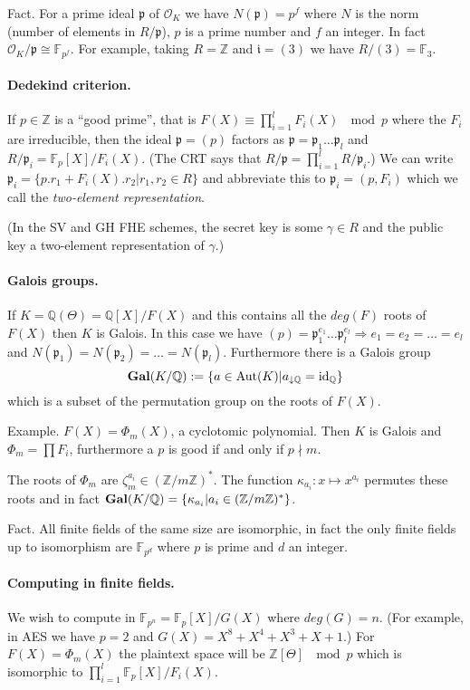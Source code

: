 \documentclass[11pt]{article}
\newcommand{\F}{\mathbb{F}}
\newcommand{\Z}{\mathbb{Z}}
\newcommand{\Q}{\mathbb{Q}}
\renewcommand{\O}{\mathcal{O}}
\renewcommand{\i}{\mathfrak{i}}
\newcommand{\p}{\mathfrak{p}}
\newcommand{\Gal}{\textup{\textbf{Gal}}}
\begin{document}
Fact. For a prime ideal $\p$ of $\O_K$ we have $N(\p) = p^f$ where $N$ is the norm (number of elements in $R/\p$), $p$ is a prime number and $f$ an integer. 
In fact $\O_K/\p \cong \F_{p^f}$.
For example, taking $R = \Z$ and $\i = (3)$ we have $R/(3) = \F_3$.

\paragraph{Dedekind criterion.}
If $p \in \Z$ is a ``good prime'', that is 
$F(X) \equiv \prod_{i=1}^l F_i(X)\ \mod p$ where the $F_i$ are irreducible, then the ideal $\p = (p)$ factors as $\p = \p_1 \ldots \p_l$ and $R/\p_i = \F_p[X]/F_i(X)$.
(The CRT says that $R/\p = \prod_{i=1}^l R/\p_i$.)
We can write $\p_i = \{ p.r_1 + F_i(X).r_2 | r_1, r_2 \in R \}$ and abbreviate this to $\p_i = (p, F_i)$ which we call the \emph{two-element representation}.

(In the SV and GH FHE schemes, the secret key is some $\gamma \in R$ and the public key a two-element representation of $\gamma$.)

\paragraph{Galois groups.}
If $K = \Q(\Theta) = \Q[X]/F(X)$ and this contains all the $deg(F)$ roots of $F(X)$ then $K$ is Galois. 
In this case we have
 $(p) = \p_1^{e_1} \ldots \p_l^{e_l} \Rightarrow e_1 = e_2 = \ldots = e_l$ and $N(\p_1) = N(\p_2) = \ldots = N(\p_l)$.
Furthermore there is a Galois group 
$$\Gal(K/\Q) := \{ a \in \textup{Aut}(K) | a_{\downarrow \Q} = \textup{id}_\Q \}$$ 
which is a subset of the permutation group on the roots of $F(X)$.

Example. $F(X) = \Phi_m(X)$, a cyclotomic polynomial. 
Then $K$ is Galois and $\Phi_m = \prod F_i$, furthermore a $p$ is good if and only if $p \nmid m$.

The roots of $\Phi_m$ are $\zeta_m^{a_i} \in (\Z/m\Z)^*$.
The function $\kappa_{a_i}: x \mapsto x^{a_i}$ permutes these roots and in fact $\Gal(K/\Q) = \{ \kappa_{a_i} | a_i \in (\Z/m\Z)^* \}$.

Fact. All finite fields of the same size are isomorphic, in fact the only finite fields up to isomorphism are $\F_{p^d}$ where $p$ is prime and $d$ an integer.

\paragraph{Computing in finite fields.}
We wish to compute in $\F_{p^n} = \F_p[X]/G(X)$ where $deg(G) = n$.
(For example, in AES we have $p = 2$ and $G(X) = X^8 + X^4 + X^3 + X + 1$.)
For $F(X) = \Phi_m(X)$ the plaintext space will be $\Z[\Theta]\ \mod p$ which is isomorphic to $\prod_{i=1}^l \F_p[X]/F_i(X)$.
\end{document}
